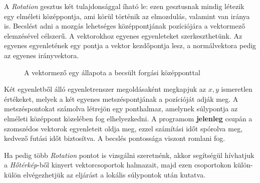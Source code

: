 
A \textit{Rotation} gesztus két tulajdonsággal íható le: ezen gesztusnak mindig létezik egy elméleti középpontja, ami körül történik az elmozdulás, valamint van iránya is.
Becslést adni a mozgás lehetséges középpontjának pozíciójára a vektormező elemzésével célszerű.
A vektorokhoz egyenes egyenleteket szerkeszthetünk. Az egyenes egyenletének egy pontja a vektor kezdőpontja lesz, a normálvektora pedig az egyenes irányvektora.

\begin{figure}[h]
\centering
{}
\caption{A vektormező egy állapota a becsült forgási középponttal}
\label{fig:rotation}
\end{figure}

Két egyenletből álló egyenletrenszer megoldásaként megkapjuk az $x,y$ ismeretlen értékeket, melyek a két egyenes metszéspontjának a pozícióját adják meg.
A metszéspontokat számolva létrejön egy ponthalmaz, amelynek súlypontja az elméleti középpont közelében fog elhelyezkedni.
A programom \textbf{jelenleg} csupán a szomszédos vektorok egyenleteit oldja meg, ezzel számítási időt spórolva meg, kedvező futási időt biztosítva. A becslés pontossága viszont romlani fog.

Ha pedig több \textit{Rotation} pontot is vizsgálni szeretnénk, akkor segítségül hívhatjuk a \textit{Hőtérkép}-ből kinyert vektorcsoportok halmazait, majd ezen csoportokon külön-külön elvégezhetjük az eljárást a lokális súlypontok után kutatva.

